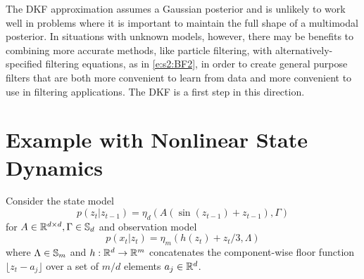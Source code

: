 The DKF approximation assumes a Gaussian posterior and is unlikely to work well in problems where it is important to maintain the full shape of a multimodal posterior. In situations with unknown models, however, there may be benefits to combining more accurate methods, like particle filtering, with alternatively-specified filtering equations, as in \eqref{e:s2:BF2}, in order to create general purpose filters that are both more convenient to learn from data and more convenient to use in filtering applications. The DKF is a first step in this direction.



\section{Example with Nonlinear State Dynamics} \label{s:nonlinear_state_ex} 
Consider the state model
\begin{equation} \label{eq:nonlinearstate}
p(z_t|z_{t-1}) = \eta_d(A(\sin(z_{t-1})+z_{t-1}),\Gamma)
\end{equation}
for $A\in \mathbb{R}^{d\times d}, \Gamma\in \mathbb{S}_d$ and observation model
\begin{equation}
p(x_t|z_t) 
= \eta_m(h(z_t)+z_t/3,\Lambda)
\end{equation}
where $\Lambda \in \mathbb{S}_m$ and $h:\mathbb{R}^d\rightarrow\mathbb{R}^m$ concatenates the component-wise floor function $\lfloor z_t-a_j\rfloor$ over a set of $m/d$ elements $a_j\in\mathbb{R}^d$.

